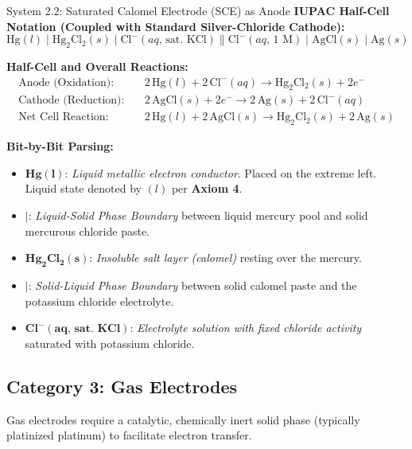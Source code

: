 \documentclass[10pt,a4paper]{article}
\begin{document}
\begin{examplebox}{System 2.2: Saturated Calomel Electrode (SCE) as Anode}
\textbf{IUPAC Half-Cell Notation (Coupled with Standard Silver-Chloride Cathode):}
\begin{equation*}
    \text{Hg}(l) \mid \text{Hg}_2\text{Cl}_2(s) \mid \text{Cl}^-(aq,\, \text{sat. KCl}) \parallel \text{Cl}^-(aq,\, 1\text{ M}) \mid \text{AgCl}(s) \mid \text{Ag}(s)
\end{equation*}

\textbf{Half-Cell and Overall Reactions:}
\begin{align*}
    \text{Anode (Oxidation):} \quad & 2\,\text{Hg}(l) + 2\,\text{Cl}^-(aq) \longrightarrow \text{Hg}_2\text{Cl}_2(s) + 2e^- \\
    \text{Cathode (Reduction):} \quad & 2\,\text{AgCl}(s) + 2e^- \longrightarrow 2\,\text{Ag}(s) + 2\,\text{Cl}^-(aq) \\
    \text{Net Cell Reaction:} \quad & 2\,\text{Hg}(l) + 2\,\text{AgCl}(s) \longrightarrow \text{Hg}_2\text{Cl}_2(s) + 2\,\text{Ag}(s)
\end{align*}

\textbf{Bit-by-Bit Parsing:}
\begin{itemize}[leftmargin=*]
    \item $\mathbf{Hg(l)}$: \textit{Liquid metallic electron conductor}. Placed on the extreme left. Liquid state denoted by $(l)$ per \textbf{Axiom 4}.
    \item $\mathbf{\mid}$: \textit{Liquid-Solid Phase Boundary} between liquid mercury pool and solid mercurous chloride paste.
    \item $\mathbf{Hg_2Cl_2(s)}$: \textit{Insoluble salt layer (calomel)} resting over the mercury.
    \item $\mathbf{\mid}$: \textit{Solid-Liquid Phase Boundary} between solid calomel paste and the potassium chloride electrolyte.
    \item $\mathbf{Cl^-(aq,\, \text{sat. KCl})}$: \textit{Electrolyte solution with fixed chloride activity} saturated with potassium chloride.
\end{itemize}
\end{examplebox}

\subsection{Category 3: Gas Electrodes}
Gas electrodes require a catalytic, chemically inert solid phase (typically platinized platinum) to facilitate electron transfer.
\end{document}
